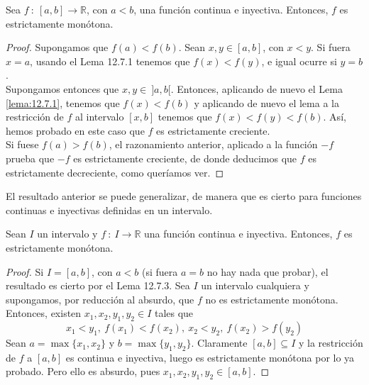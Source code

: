 \begin{lema}
    Sea $f ~:~ [a,b] \longrightarrow \mathbb{R}$, con $a < b$, una función continua e inyectiva. Entonces, $f$ es estrictamente monótona.
\end{lema}
\begin{proof}
    Supongamos que $f(a) < f(b)$. Sean $x,y \in [a,b]$, con $x < y$. Si fuera $x = a$, usando el Lema 12.7.1 tenemos que
    $f(x) < f(y)$, e igual ocurre si $y = b$.\\
    
    Supongamos entonces que $x,y \in ~ ]a,b[$. Entonces, aplicando de nuevo el Lema \ref{lema:12.7.1}, tenemos que $f(x) < f(b)$ y aplicando de nuevo el lema a la restricción de $f$ al intervalo $[x,b]$ tenemos que $f(x) < f(y) < f(b)$. Así, hemos probado en este caso que $f$ es estrictamente creciente.\\
    
    Si fuese $f(a) > f(b)$, el razonamiento anterior, aplicado a la función $-f$ prueba que $-f$ es estrictamente creciente,
    de donde deducimos que $f$ es estrictamente decreciente, como queríamos ver.
\end{proof}

El resultado anterior se puede generalizar, de manera que es cierto para funciones continuas e inyectivas definidas en un intervalo.
\begin{teo}
    Sean $I$ un intervalo y $f ~:~ I \longrightarrow \mathbb{R}$ una función continua e inyectiva. Entonces, $f$ es estrictamente monótona.
\end{teo}
\begin{proof}
    Si $I = [a,b]$, con $a < b$ (si fuera $a = b$ no hay nada que probar), el resultado es cierto por el Lema 12.7.3.
    Sea $I$ un intervalo cualquiera y supongamos, por reducción al absurdo, que $f$ no es estrictamente monótona.
    Entonces, existen $x_1,x_2,y_1,y_2 \in I$ tales que
    \begin{equation*}
        x_1 < y_1, ~ f(x_1) < f(x_2), ~ x_2 < y_2, ~ f(x_2) > f(y_2)
    \end{equation*}
    Sean $a = \max \{x_1, x_2\}$ y $b = \max \{y_1, y_2\}$. Claramente $[a,b] \subseteq I$ y la restricción de $f$ a $[a,b]$
    es continua e inyectiva, luego es estrictamente monótona por lo ya probado. Pero ello es absurdo, pues $x_1,x_2,y_1,y_2 \in [a,b]$.
\end{proof}

